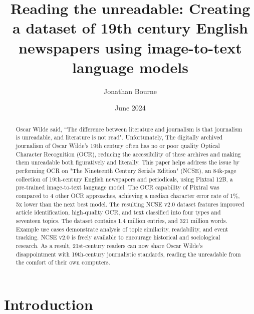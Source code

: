 \documentclass{article} %
\title{Reading the unreadable: Creating a dataset of 19th century English newspapers using image-to-text language models}
\author{Jonathan Bourne}
\date{June 2024}
\begin{document}
\maketitle

\begin{abstract}

Oscar Wilde said, ``The difference between literature and journalism is that journalism is unreadable, and literature is not read". Unfortunately, The digitally archived journalism of Oscar Wilde's 19th century often has no or poor quality Optical Character Recognition (OCR), reducing the accessibility of these archives and making them unreadable both figuratively and literally. This paper helps address the issue by performing OCR on "The Nineteenth Century Serials Edition" (NCSE), an 84k-page collection of 19th-century English newspapers and periodicals, using Pixtral 12B, a pre-trained image-to-text language model. The OCR capability of Pixtral was compared to 4 other OCR approaches, achieving a median character error rate of 1\%, 5x lower than the next best model. The resulting NCSE v2.0 dataset features improved article identification, high-quality OCR, and text classified into four types and seventeen topics. The dataset contains 1.4 million entries, and 321 million words. Example use cases demonstrate analysis of topic similarity, readability, and event tracking. NCSE v2.0 is freely available to encourage historical and sociological research. As a result, 21st-century readers can now share Oscar Wilde's disappointment with 19th-century journalistic standards, reading the unreadable from the comfort of their own computers.

\end{abstract}


\section{Introduction}
\end{document}
